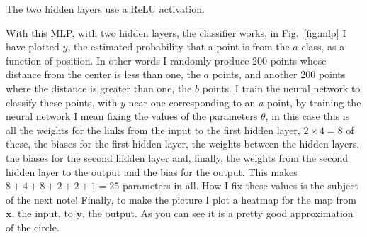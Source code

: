 \documentclass[12pt]{article}
\begin{document}
\begin{center}
\end{center}
The two hidden layers use a ReLU activation.

With this MLP, with two hidden layers, the classifier works, in
Fig.~\ref{fig:mlp} I have plotted $y$, the estimated probability that a point is
from the $a$ class, as a function of position. In other words I
randomly produce 200 points whose distance from the center is less
than one, the $a$ points, and another 200 points where the distance is
greater than one, the $b$ points. I train the neural network to
classify these points, with $y$ near one corresponding to an $a$
point, by training the neural network I mean fixing the values of the
parameters $\theta$, in this case this is all the weights for the
links from the input to the first hidden layer, $2\times 4=8$ of
these, the biases for the first hidden layer, the weights between the
hidden layers, the biases for the second hidden layer and, finally,
the weights from the second hidden layer to the output and the bias
for the output. This makes $8+4+8+2+2+1=25$ parameters in all. How I
fix these values is the subject of the next note! Finally, to make the
picture I plot a heatmap for the map from $\textbf{x}$, the input, to
$\textbf{y}$, the output. As you can see it is a pretty good
approximation of the circle.
\end{document}
